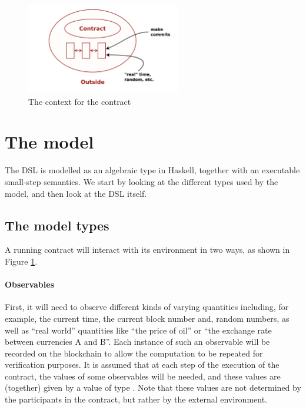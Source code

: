 \documentclass[
      acmsmall
    , screen
    , review=true
  ]{acmart}
\begin{document}
\begin{figure}[t]
\begin{center}
\includegraphics[width=0.6\textwidth]{pix/context.png}
\caption{The context for the contract}
\label{fig:context}
\end{center}
\end{figure}


\section{The model}

The DSL is modelled as an algebraic type in Haskell, together with an executable small-step semantics. 
We start by looking at the different types used by the model, and then look at the  DSL itself. 

\subsection{The model types}

A running contract will interact with its environment in two ways, as shown in Figure \ref{fig:context}.

\paragraph{Observables}


First, it will need to observe different kinds of varying quantities including, for example, the current time, the current block number and, random numbers, as well as ``real world'' quantities like ``the price of oil'' or ``the exchange rate between currencies A and B''. Each instance of such an observable will be recorded on the blockchain to allow the computation to be repeated for verification purposes. It is assumed that at each step of the execution of the contract, the values of some observables will be needed, and these values are (together) given by a value of type . Note that these values are not determined by the participants in the contract, but rather by the external environment.
\end{document}
